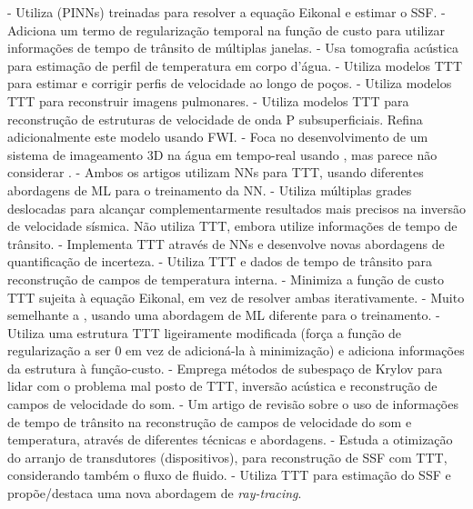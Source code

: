 \begin{itemize}
	 - Utiliza  (PINNs) treinadas para resolver a equação Eikonal e estimar o SSF.
	 - Adiciona um termo de regularização temporal na função de custo para utilizar informações de tempo de trânsito de múltiplas janelas.
	 - Usa tomografia acústica para estimação de perfil de temperatura em corpo d'água.
	 - Utiliza modelos TTT para estimar e corrigir perfis de velocidade ao longo de poços.
	 - Utiliza modelos TTT para reconstruir imagens pulmonares.
	 - Utiliza modelos TTT para reconstrução de estruturas de velocidade de onda P subsuperficiais. Refina adicionalmente este modelo usando FWI.
	 - Foca no desenvolvimento de um sistema de imageamento 3D na água em tempo-real usando , mas parece não considerar .
	 - Ambos os artigos utilizam NNs para TTT, usando diferentes abordagens de ML para o treinamento da NN.
	 - Utiliza múltiplas grades deslocadas para alcançar complementarmente resultados mais precisos na inversão de velocidade sísmica. Não utiliza TTT, embora utilize informações de tempo de trânsito.
	 - Implementa TTT através de NNs e desenvolve novas abordagens de quantificação de incerteza.
	 - Utiliza TTT e dados de tempo de trânsito para reconstrução de campos de temperatura interna.
	 - Minimiza a função de custo TTT sujeita à equação Eikonal, em vez de resolver ambas iterativamente.
	 - Muito semelhante a \cite{jo_seismic_2023}, usando uma abordagem de ML diferente para o treinamento.
	 - Utiliza uma estrutura TTT ligeiramente modificada (força a função de regularização a ser 0 em vez de adicioná-la à minimização) e adiciona informações da estrutura à função-custo.
	 - Emprega métodos de subespaço de Krylov para lidar com o problema mal posto de TTT, inversão acústica e reconstrução de campos de velocidade do som.
	 - Um artigo de revisão sobre o uso de informações de tempo de trânsito na reconstrução de campos de velocidade do som e temperatura, através de diferentes técnicas e abordagens.
	 - Estuda a otimização do arranjo de transdutores (dispositivos), para reconstrução de SSF com TTT, considerando também o fluxo de fluido.
	 - Utiliza TTT para estimação do SSF e propõe/destaca uma nova abordagem de \textsl{ray-tracing}.
\end{itemize}


